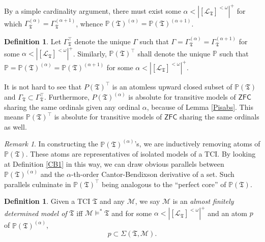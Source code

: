 \documentclass[12pt, twoside]{memoir}
\numberwithin{equation}{section}
\theoremstyle{definition}
\newtheorem{defi}[thm]{Definition}
\theoremstyle{remark}
\newtheorem{rem}[thm]{Remark}
\theoremstyle{definition}
\theoremstyle{definition}
\theoremstyle{definition}
\theoremstyle{remark}
\begin{document}
By a simple cardinality argument, there must exist some $\alpha < |[\mathcal{L}_{\mathfrak{T}}]^{< \omega}|^+$ for which $\Gamma_{\mathfrak{T}}^{(\alpha)} = \Gamma_{\mathfrak{T}}^{(\alpha + 1)}$, whence $\mathbb{P}(\mathfrak{T})^{(\alpha)} = \mathbb{P}(\mathfrak{T})^{(\alpha + 1)}$.

\begin{defi}\label{CB2}
Let $\Gamma_{\mathfrak{T}}^{\top}$ denote the unique $\Gamma$ such that $\Gamma = \Gamma_{\mathfrak{T}}^{(\alpha)} = \Gamma_{\mathfrak{T}}^{(\alpha + 1)}$ for some $\alpha < |[\mathcal{L}_{\mathfrak{T}}]^{< \omega}|^+$. Similarly, $\mathbb{P}(\mathfrak{T})^{\top}$ shall denote the unique $\mathbb{P}$ such that $\mathbb{P} = \mathbb{P}(\mathfrak{T})^{(\alpha)} = \mathbb{P}(\mathfrak{T})^{(\alpha + 1)}$ for some $\alpha < |[\mathcal{L}_{\mathfrak{T}}]^{< \omega}|^+$.
\end{defi}

It is not hard to see that $P(\mathfrak{T})^{\top}$ is an atomless upward closed subset of $\mathbb{P}(\mathfrak{T})$ and $\Gamma_{\mathfrak{T}} \subset \Gamma_{\mathfrak{T}}^{\top}$. Furthermore, $P(\mathfrak{T})^{(\alpha)}$ is absolute for transitive models of $\mathsf{ZFC}$ sharing the same ordinals given any ordinal $\alpha$, because of Lemma \ref{Pisabs}. This means $\mathbb{P}(\mathfrak{T})^{\top}$ is absolute for transitive models of $\mathsf{ZFC}$ sharing the same ordinals as well.

\begin{rem}\label{CBrem}
In constructing the $\mathbb{P}(\mathfrak{T})^{(\alpha)}$'s, we are inductively removing atoms of $\mathbb{P}(\mathfrak{T})$. These atoms are representatives of isolated models of a TCI. By looking at Definition \ref{CB1} in this way, we can draw obvious parallels between $\mathbb{P}(\mathfrak{T})^{(\alpha)}$ and the $\alpha$-th-order Cantor-Bendixson derivative of a set. Such parallels culminate in $\mathbb{P}(\mathfrak{T})^{\top}$ being analogous to the ``perfect core'' of $\mathbb{P}(\mathfrak{T})$.
\end{rem}

\begin{defi}
Given a TCI $\mathfrak{T}$ and any $\mathcal{M}$, we say $\mathcal{M}$ is an \emph{almost finitely determined model of} $\mathfrak{T}$ iff $\mathcal{M} \models^* \mathfrak{T}$ and for some $\alpha < |[\mathcal{L}_{\mathfrak{T}}]^{< \omega}|^+$ and an atom $p$ of $\mathbb{P}(\mathfrak{T})^{(\alpha)}$, $$p \subset \Sigma(\mathfrak{T}, \mathcal{M}).$$
\end{defi}
\end{document}
